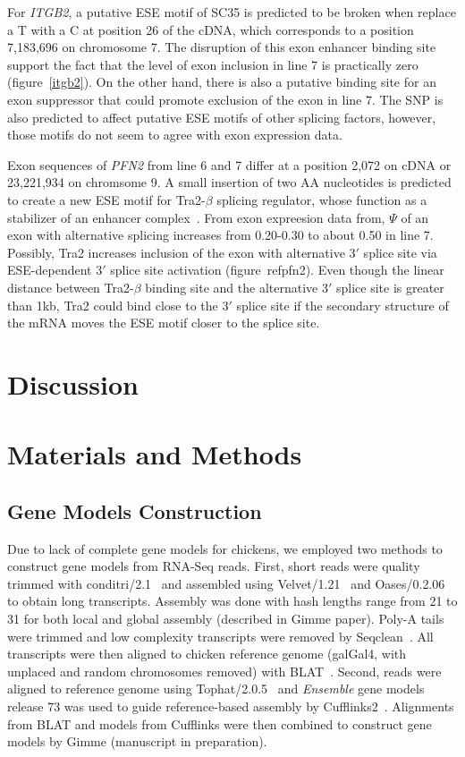 \documentclass[10pt]{article}
\begin{document}
For \textit{ITGB2}, a putative ESE motif of SC35 is predicted to be broken when replace a T with a C at position 26 of the cDNA, which
corresponds to a position 7,183,696 on chromosome 7.
The disruption of this exon enhancer binding site support the fact that the level of exon inclusion in line 7 is
practically zero (figure~\ref{itgb2}).
On the other hand, there is also a putative binding site for an exon suppressor that could promote exclusion of the exon in line 7.
The SNP is also predicted to affect putative ESE motifs of other splicing factors, however, those motifs do not seem to agree with
exon expression data.

Exon sequences of \textit{PFN2} from line 6 and 7 differ at a position 2,072 on cDNA or 23,221,934 on chromsome 9.
A small insertion of two AA nucleotides is predicted to create a new ESE motif for Tra2-$\beta$ splicing regulator,
whose function as a stabilizer of an enhancer complex~\cite{lopez1998alternative}.
From exon expreesion data from, $\Psi$ of an exon with alternative splicing increases from 0.20-0.30 to about 0.50 in line 7.
Possibly, Tra2 increases inclusion of the exon with alternative 3$\prime$ splice site via
ESE-dependent 3$\prime$ splice site activation (figure~ref{pfn2}).
Even though the linear distance between Tra2-$\beta$ binding site and the alternative 3$\prime$ splice site is
greater than 1kb, Tra2 could bind close to the 3$\prime$ splice site if the secondary structure of the mRNA moves the
ESE motif closer to the splice site.

\section*{Discussion}


\section*{Materials and Methods}
\subsection{Gene Models Construction}

Due to lack of complete gene models for chickens, we employed two methods to
construct gene models from RNA-Seq reads.
First, short reads were quality trimmed with conditri/2.1~\cite{}
and assembled using Velvet/1.21~\cite{} and Oases/0.2.06~\cite{} to obtain long transcripts.
Assembly was done with hash lengths range from 21 to 31 for both local and global assembly
(described in Gimme paper).
Poly-A tails were trimmed and low complexity transcripts were removed by Seqclean~\cite{}.
All transcripts were then aligned to chicken reference genome (galGal4, with unplaced and random 
chromosomes removed) with BLAT~\cite{}.
Second, reads were aligned to reference genome using Tophat/2.0.5~\cite{} and \textit{Ensemble} gene
models release 73 was used to guide reference-based assembly by Cufflinks2~\cite{}.
Alignments from BLAT and models from Cufflinks were then combined to construct gene models by Gimme
(manuscript in preparation).
\end{document}
